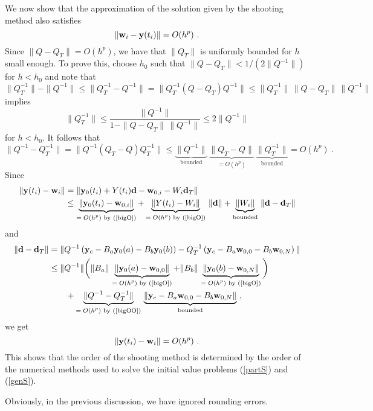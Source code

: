 We now show that the approximation of
the solution given by the shooting method also satisfies
\[
\| \mathbf{w}_i - \mathbf{y}(t_i) \| = O(h^p) \ .
\]
Since $\| Q - Q_T \| = O(h^p)$, we have that $\|Q_T\|$ is uniformly
bounded for $h$ small enough.  To prove this, choose $h_0$ such that
$\|Q - Q_T\| < 1/(2\|Q^{-1}\|) $ for $h < h_0$ and note that
\[
\|Q_T^{-1}\| - \|Q^{-1}\| \leq \|Q_T^{-1} - Q^{-1}\|
= \| Q_T^{-1} (Q - Q_T) Q^{-1} \|
\leq \|Q_T^{-1}\| \, \|Q- Q_T \| \, \|Q^{-1}\|
\]
implies
\[
\|Q_T^{-1}\| \leq \frac{\|Q^{-1}\|}{1- \|Q-Q_T\|\,\|Q^{-1}\|} \leq 2\|Q^{-1}\|
\]
for $h < h_0$.  It follows that
\begin{equation} \label{bigOO}
\| Q^{-1} - Q_T^{-1} \| = \| Q^{-1}(Q_T - Q) Q_T^{-1}\|
\leq \underbrace{\| Q^{-1}\|}_{\text{bounded}}\,
\underbrace{\|Q_T - Q\|}_{=O(h^p)}\,\underbrace{\| Q_T^{-1}\|}_{\text{bounded}}
= O(h^p) \ .
\end{equation}
Since
\begin{align*}
\| \mathbf{y}(t_i) - \mathbf{w}_i \|
&= \| \mathbf{y}_0(t_i) + Y(t_i)\mathbf{d} - \mathbf{w}_{0,i}
- W_i \mathbf{d}_T \| \\
& \leq \underbrace{\| \mathbf{y}_0(t_i) - \mathbf{w}_{0,i}
\|}_{\text{$=O(h^p)$ by (\ref{bigO})}} +
\underbrace{\| Y(t_i) - W_i
\|}_{\text{$=O(h^p)$ by (\ref{bigO})}}
\,\| \mathbf{d} \| +
\underbrace{\| W_i \|}_{\text{bounded}}
\,\| \mathbf{d} - \mathbf{d}_T \|
\end{align*}
and
\begin{align*}
\| \mathbf{d} - \mathbf{d}_T \| &
= \| Q^{-1} \left( \mathbf{y}_c - B_a \mathbf{y}_0(a)
- B_b \mathbf{y}_0(b)\right)
- Q_T^{-1} \left( \mathbf{y}_c - B_a \mathbf{w}_{0,0}
- B_b \mathbf{w}_{0,N} \right) \| \\
&\leq \| Q^{-1} \| \bigg( \| B_a \| \,
\underbrace{\| \mathbf{y}_0(a) - \mathbf{w}_{0,0}
\|}_{\text{$=O(h^p)$ by (\ref{bigO})}}
+ \| B_b \| \,
\underbrace{\| \mathbf{y}_0(b) - \mathbf{w}_{0,N}
\|}_{\text{$=O(h^p)$ by (\ref{bigO})}} \bigg) \\
& \qquad + \underbrace{\| Q^{-1} - Q^{-1}_T
\|}_{\text{$=O(h^p)$ by (\ref{bigOO})}}
\,\underbrace{\| \mathbf{y}_c - B_a \mathbf{w}_{0,0} - B_b \mathbf{w}_{0,N}
\|}_{\text{bounded}} \ ,
\end{align*}
we get
\[
\| \mathbf{y}(t_i) - \mathbf{w}_i \| = O(h^p) \ .
\]
This shows that the order of the shooting method is determined by the
order of the numerical methods used to solve the initial value
problems (\ref{partS}) and (\ref{genS}).

Obviously, in the previous discussion, we have ignored rounding errors.

